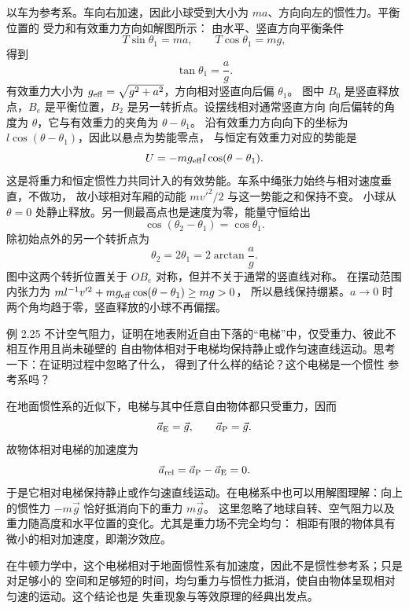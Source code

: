 \begin{xesolution}
以车为参考系。车向右加速，因此小球受到大小为 $ma$、方向向左的惯性力。平衡位置的
受力和有效重力方向如解图所示：
\soldiagTwoTwentyFour
由水平、竖直方向平衡条件
\[
 T\sin\theta_1=ma,
 \qquad
 T\cos\theta_1=mg,
\]
得到
\[
 \boxed{\tan\theta_1=\frac ag}.
\]
有效重力大小为 $g_{\rm eff}=\sqrt{g^2+a^2}$，方向相对竖直向后偏 $\theta_1$。
图中 $B_0$ 是竖直释放点，$B_e$ 是平衡位置，$B_2$ 是另一转折点。设摆线相对通常竖直方向
向后偏转的角度为 $\theta$，它与有效重力的夹角为 $\theta-\theta_1$。
沿有效重力方向向下的坐标为 $l\cos(\theta-\theta_1)$，因此以悬点为势能零点，
与恒定有效重力对应的势能是
\[
 U=-mg_{\rm eff}l\cos(\theta-\theta_1).
\]
这是将重力和恒定惯性力共同计入的有效势能。车系中绳张力始终与相对速度垂直，不做功，
故小球相对车厢的动能 $mv'^2/2$ 与这一势能之和保持不变。
小球从 $\theta=0$ 处静止释放。另一侧最高点也是速度为零，能量守恒给出
\[
 \cos(\theta_2-\theta_1)=\cos\theta_1.
\]
除初始点外的另一个转折点为
\[
 \boxed{\theta_2=2\theta_1
 =2\arctan\frac ag}.
\]
图中这两个转折位置关于 $OB_e$ 对称，但并不关于通常的竖直线对称。
在摆动范围内张力为 $ml^{-1}v'^2+mg_{\rm eff}\cos(\theta-\theta_1)\ge mg>0$，
所以悬线保持绷紧。$a\to0$ 时两个角均趋于零，竖直释放的小球不再偏摆。
\end{xesolution}

\begin{origexamplebox}{例 2.25}
不计空气阻力，证明在地表附近自由下落的“电梯”中，仅受重力、彼此不相互作用且尚未碰壁的
自由物体相对于电梯均保持静止或作匀速直线运动。思考一下：在证明过程中忽略了什么，
得到了什么样的结论？这个电梯是一个惯性
参考系吗？
\probdiagTwoTwentyFive
\end{origexamplebox}

\begin{xesolution}
在地面惯性系的近似下，电梯与其中任意自由物体都只受重力，因而
\[
 \vec a_{\rm E}=\vec g,
 \qquad
 \vec a_{\rm P}=\vec g.
\]
故物体相对电梯的加速度为
\[
 \vec a_{\rm rel}=\vec a_{\rm P}-\vec a_{\rm E}=0.
\]
于是它相对电梯保持静止或作匀速直线运动。在电梯系中也可以用解图理解：向上的惯性力
$-m\vec g$ 恰好抵消向下的重力 $m\vec g$。
\soldiagTwoTwentyFive
这里忽略了地球自转、空气阻力以及重力随高度和水平位置的变化。尤其是重力场不完全均匀：
相距有限的物体具有微小的相对加速度，即潮汐效应。

在牛顿力学中，这个电梯相对于地面惯性系有加速度，因此不是惯性参考系；只是对足够小的
空间和足够短的时间，均匀重力与惯性力抵消，使自由物体呈现相对匀速的运动。这个结论也是
失重现象与等效原理的经典出发点。
\end{xesolution}

